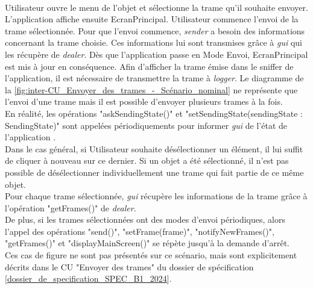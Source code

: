 \\
Utilisateur ouvre le menu de l'objet et sélectionne la trame qu'il souhaite envoyer. L'application {\nomApplication} affiche ensuite EcranPrincipal. Utilisateur commence l'envoi de la trame sélectionnée.  Pour que l'envoi commence, \textit{sender} a besoin des informations concernant la trame choisie. Ces informations lui sont transmises grâce à \textit{gui} qui les récupère de \textit{dealer}. Dès que l'application passe en Mode Envoi, EcranPrincipal est mis à jour en conséquence. Afin d'afficher la trame émise dans le sniffer de l'application, il est nécessaire de transmettre la trame à \textit{logger}. Le diagramme de la \autoref{fig:inter-CU_Envoyer_des_trames_-_Scénario_nominal} ne représente que l'envoi d'une trame mais il est possible d'envoyer plusieurs trames à la fois. \\
En réalité, les opérations "askSendingState()" et "setSendingState(sendingState : SendingState)" sont appelées périodiquements pour informer \textit{gui} de l'état de l'application {\nomApplication}. \\

Dans le cas général, si Utilisateur souhaite désélectionner un élément, il lui suffit de cliquer à nouveau sur ce dernier. Si un objet a été sélectionné, il n'est pas possible de désélectionner individuellement une trame qui fait partie de ce même objet. \\
Pour chaque trame sélectionnée, \textit{gui} récupère les informations de la trame grâce à l'opération "getFrames()" de \textit{dealer}. \\
De plus, si les trames sélectionnées ont des modes d'envoi périodiques, alors l'appel des opérations "send()", "setFrame(frame)", "notifyNewFrames()", "getFrames()" et "displayMainScreen()" se répète jusqu'à la demande d'arrêt. \\
Ces cas de figure ne sont pas présentés sur ce scénario, mais sont explicitement décrits dans le CU "Envoyer des trames" du dossier de spécification [\hyperref[SPEC]{dossier\_de\_specification\_SPEC\_B1\_2024}].